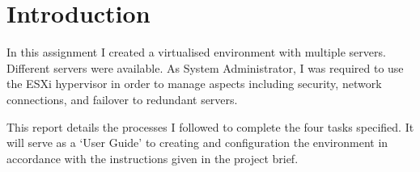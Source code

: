 \pagebreak
\section{Introduction}
In this assignment I created a virtualised environment with multiple servers. Different servers were available. As System Administrator, I was required to use the ESXi hypervisor in order to manage aspects including security, network connections, and failover to redundant servers.

This report details the processes I followed to complete the four tasks specified. It will serve as a `User Guide' to creating and configuration the environment in accordance with the instructions given in the project brief.
